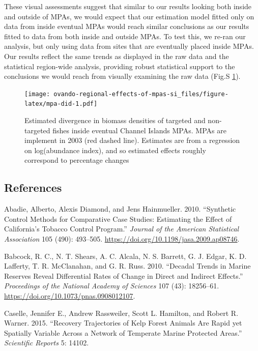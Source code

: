 \documentclass[]{article}
\begin{document}
These visual assessments suggest that similar to our results looking both inside and outside of MPAs, we would expect that our estimation model fitted only on data from inside eventual MPAs would reach similar conclusions as our results fitted to data from both inside and outside MPAs. To test this, we re-ran our analysis, but only using data from sites that are eventually placed inside MPAs. Our results reflect the same trends as displayed in the raw data and the statistical region-wide analysis, providing robust statistical support to the conclusions we would reach from visually examining the raw data (Fig.S \ref{fig:mpa-did}).

\begin{figure}
\centering
\texttt{[image: ovando-regional-effects-of-mpas-si\_files/figure-latex/mpa-did-1.pdf]}
\caption{\label{fig:mpa-did}Estimated divergence in biomass densities of targeted and non-targeted fishes inside eventual Channel Islands MPAs. MPAs are implement in 2003 (red dashed line). Estimates are from a regression on log(abundance index), and so estimated effects roughly correspond to percentage changes}
\end{figure}

\hypertarget{references}{%
\subsection*{References}\label{references}}

\hypertarget{refs}{}
\leavevmode\hypertarget{ref-abadie2010}{}%
Abadie, Alberto, Alexis Diamond, and Jens Hainmueller. 2010. ``Synthetic Control Methods for Comparative Case Studies: Estimating the Effect of California's Tobacco Control Program.'' \emph{Journal of the American Statistical Association} 105 (490): 493--505. \url{https://doi.org/10.1198/jasa.2009.ap08746}.

\leavevmode\hypertarget{ref-babcock2010}{}%
Babcock, R. C., N. T. Shears, A. C. Alcala, N. S. Barrett, G. J. Edgar, K. D. Lafferty, T. R. McClanahan, and G. R. Russ. 2010. ``Decadal Trends in Marine Reserves Reveal Differential Rates of Change in Direct and Indirect Effects.'' \emph{Proceedings of the National Academy of Sciences} 107 (43): 18256--61. \url{https://doi.org/10.1073/pnas.0908012107}.

\leavevmode\hypertarget{ref-caselle2015}{}%
Caselle, Jennifer E., Andrew Rassweiler, Scott L. Hamilton, and Robert R. Warner. 2015. ``Recovery Trajectories of Kelp Forest Animals Are Rapid yet Spatially Variable Across a Network of Temperate Marine Protected Areas.'' \emph{Scientific Reports} 5: 14102.
\end{document}
